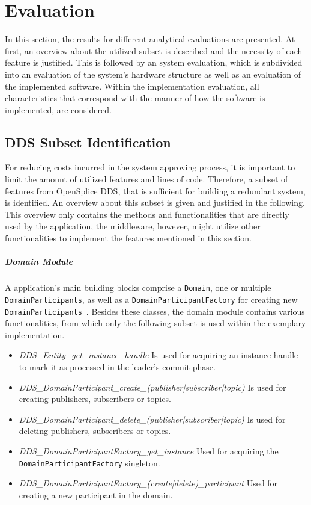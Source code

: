 \chapter{Evaluation}
\label{cpt:evaluation}
In this section, the results for different analytical evaluations are presented.
At first, an overview about the utilized  subset is described and the necessity of each feature is justified.
This is followed by an system evaluation, which is subdivided into an evaluation of the system's hardware structure as well as an evaluation of the implemented software.
Within the implementation evaluation, all characteristics that correspond with the manner of how the software is implemented, are considered.

\section{DDS Subset Identification}

For reducing costs incurred in the system approving process, it is important to limit the amount of utilized features and lines of code.
Therefore, a subset of  features from OpenSplice DDS, that is sufficient for building a redundant system, is identified.
An overview about this subset is given and justified in the following.
This overview only contains the methods and functionalities that are directly used by the application, the middleware, however, might utilize other functionalities to implement the features mentioned in this section.

\paragraph{Domain Module}
A  application's main building blocks comprise a \texttt{Domain}, one or multiple \texttt{DomainParticipants}, as well as a \texttt{DomainParticipantFactory} for creating new \texttt{DomainParticipants}~\cite{omgDDSspec}.
Besides these classes, the domain module contains various functionalities, from which only the following subset is used within the exemplary implementation.

\begin{itemize}
\item \textit{DDS\_Entity\_get\_instance\_handle} Is used for acquiring an instance handle to mark it as processed in the leader's commit phase.
\item \textit{DDS\_DomainParticipant\_create\_(publisher|subscriber|topic)} Is used for creating  publishers, subscribers or topics.
\item \textit{DDS\_DomainParticipant\_delete\_(publisher|subscriber|topic)} Is used for deleting  publishers, subscribers or topics.
\item \textit{DDS\_DomainParticipantFactory\_get\_instance} Used for acquiring the \texttt{DomainParticipantFactory} singleton.
\item \textit{DDS\_DomainParticipantFactory\_(create|delete)\_participant} Used for creating a new participant in the  domain.
\end{itemize}

